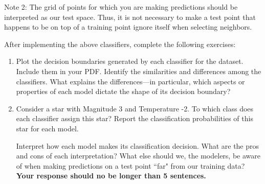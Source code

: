 \documentclass[submit]{harvardml}
\begin{document}
\begin{problem}
\begin{enumerate}[label=\alph*)]
  Note 2: The grid of points for which you are making predictions
  should be interpreted as our test space.  Thus, it is not necessary
  to make a test point that happens to be on top of a training point
  ignore itself when selecting neighbors.

\end{enumerate}

After implementing the above classifiers, complete the following exercises:

\begin{enumerate}
    \item Plot the decision boundaries generated by each classifier for the dataset. Include them in your PDF. 
    Identify the similarities and differences among the classifiers. What explains the differences---in particular, which aspects or properties of each model dictate the shape of its decision boundary? 
    
    \item 
    
    Consider a star with Magnitude 3 and Temperature -2. To which class does each classifier assign this star? Report the classification probabilities of this star for each model. 
    
    Interpret how each model makes its classification decision. What are the pros and cons of each interpretation? What else should we, the modelers, be aware of when making predictions on a test point ``far" from our training data? \textbf{Your response should no be longer than 5 sentences.}
\end{enumerate}
\end{problem}
\end{document}
